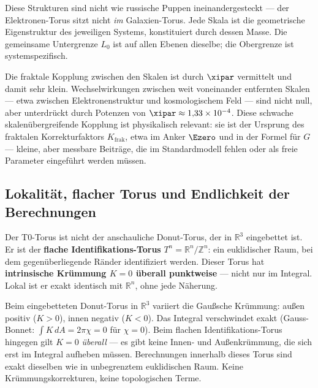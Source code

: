 \begin{keypoint}
Diese Strukturen sind nicht wie russische Puppen ineinandergesteckt — der Elektronen-Torus sitzt nicht \textit{im} Galaxien-Torus. Jede Skala ist die geometrische Eigenstruktur des jeweiligen Systems, konstituiert durch dessen Masse. Die gemeinsame Untergrenze $L_0$ ist auf allen Ebenen dieselbe; die Obergrenze ist systemspezifisch.

Die fraktale Kopplung zwischen den Skalen ist durch $\xipar$ vermittelt und damit sehr klein. Wechselwirkungen zwischen weit voneinander entfernten Skalen — etwa zwischen Elektronenstruktur und kosmologischem Feld — sind nicht null, aber unterdrückt durch Potenzen von $\xipar \approx 1{,}33 \times 10^{-4}$. Diese schwache skalenübergreifende Kopplung ist physikalisch relevant: sie ist der Ursprung des fraktalen Korrekturfaktors $K_{\text{frak}}$, etwa im Anker $\Ezero$ und in der Formel für $G$ — kleine, aber messbare Beiträge, die im Standardmodell fehlen oder als freie Parameter eingeführt werden müssen.
\end{keypoint}

\subsection{Lokalität, flacher Torus und Endlichkeit der Berechnungen}

Der T0-Torus ist nicht der anschauliche Donut-Torus, der in $\mathbb{R}^3$ eingebettet ist. Er ist der \textbf{flache Identifikations-Torus} $T^n = \mathbb{R}^n / \mathbb{Z}^n$: ein euklidischer Raum, bei dem gegenüberliegende Ränder identifiziert werden. Dieser Torus hat \textbf{intrinsische Krümmung $K = 0$ überall punktweise} — nicht nur im Integral. Lokal ist er exakt identisch mit $\mathbb{R}^n$, ohne jede Näherung.

\begin{keypoint}
Beim eingebetteten Donut-Torus in $\mathbb{R}^3$ variiert die Gaußsche Krümmung: außen positiv ($K > 0$), innen negativ ($K < 0$). Das Integral verschwindet exakt (Gauss-Bonnet: $\int K\,dA = 2\pi\chi = 0$ für $\chi = 0$). Beim flachen Identifikations-Torus hingegen gilt $K = 0$ \emph{überall} — es gibt keine Innen- und Außenkrümmung, die sich erst im Integral aufheben müssen. Berechnungen innerhalb dieses Torus sind exakt dieselben wie in unbegrenztem euklidischen Raum. Keine Krümmungskorrekturen, keine topologischen Terme.
\end{keypoint}

